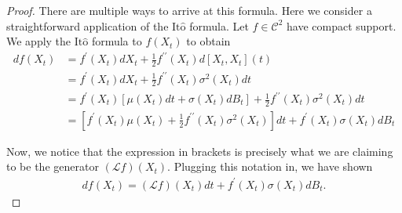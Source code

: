 \documentclass[12pt]{article}
\newcommand{\state}[1][t]{X_{#1}}
\newcommand{\BM}[1][t]{B_{#1}} %
\newcommand{\gen}{\mathcal{L}} %
\newcommand{\ito}{\text{It}\hat{\text{o}}}
\begin{document}
\begin{proof} 
There are multiple ways to arrive at this formula. Here we consider a straightforward application of the $\ito$ formula. Let $f \in \mathcal{C}^2$ have compact support. 
We apply the $\ito$ formula to $f(\state)$ to obtain 
\begin{align*}
df(\state)
&= f^\prime(\state) d\state + \frac{1}{2} f^{\prime\prime}(\state) d[\state, \state](t) \\
&= f^\prime(\state) d\state + \frac{1}{2} f^{\prime\prime}(\state) \sigma^2(\state) dt \\
&= f^\prime(\state) \left[\mu(\state) dt + \sigma(\state) d\BM \right] + \frac{1}{2} f^{\prime\prime}(\state) \sigma^2(\state) dt \\
&= \left[f^\prime(\state)\mu(\state) +  \frac{1}{2} f^{\prime\prime}(\state) \sigma^2(\state) \right] dt + f^\prime(\state) \sigma(\state) d\BM
\end{align*}

Now, we notice that the expression in brackets is precisely what we are claiming to be the generator $(\gen f)(\state)$. Plugging this notation in, we have shown
\begin{align}
df(\state) = (\gen f)(\state) dt +  f^\prime(\state) \sigma(\state) d\BM. \label{Ito_formula_generator}
\end{align}


\end{proof}
\end{document}
